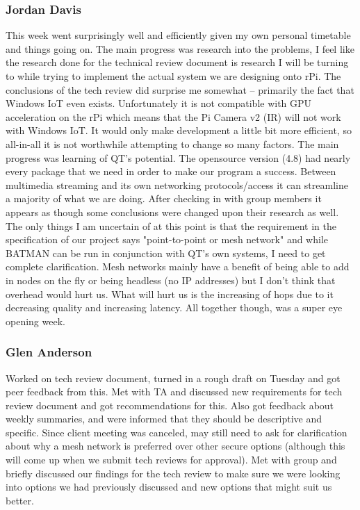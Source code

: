 \documentclass[onecolumn, draftclsnofoot,10pt, compsoc]{IEEEtran}
\begin{document}
\subsubsection{Jordan Davis}
This week went surprisingly well and efficiently given my own personal timetable and things going on. The main progress was research into the problems, I feel like the research done for the technical review document is research I will be turning to while trying to implement the actual system we are designing onto rPi. The conclusions of the tech review did surprise me somewhat -- primarily the fact that Windows IoT even exists. Unfortunately it is not compatible with GPU acceleration on the rPi which means that the Pi Camera v2 (IR) will not work with Windows IoT. It would only make development a little bit more efficient, so all-in-all it is not worthwhile attempting to change so many factors. The main progress was learning of QT's potential. The opensource version (4.8) had nearly every package that we need in order to make our program a success. Between multimedia streaming and its own networking protocols/access it can streamline a majority of what we are doing. After checking in with group members it appears as though some conclusions were changed upon their research as well. The only things I am uncertain of at this point is that the requirement in the specification of our project says "point-to-point or mesh network" and while BATMAN can be run in conjunction with QT's own systems, I need to get complete clarification. Mesh networks mainly have a benefit of being able to add in nodes on the fly or being headless (no IP addresses) but I don't think that overhead would hurt us. What will hurt us is the increasing of hops due to it decreasing quality and increasing latency. All together though, was a super eye opening week.


\subsubsection{Glen Anderson}
Worked on tech review document, turned in a rough draft on Tuesday and got peer feedback from this. Met with TA and discussed new requirements for tech review document and got recommendations for this. Also got feedback about weekly summaries, and were informed that they should be descriptive and specific. Since client meeting was canceled, may still need to ask for clarification about why a mesh network is preferred over other secure options (although this will come up when we submit tech reviews for approval). Met with group and briefly discussed our findings for the tech review to make sure we were looking into options we had previously discussed and new options that might suit us better. 
\end{document}
